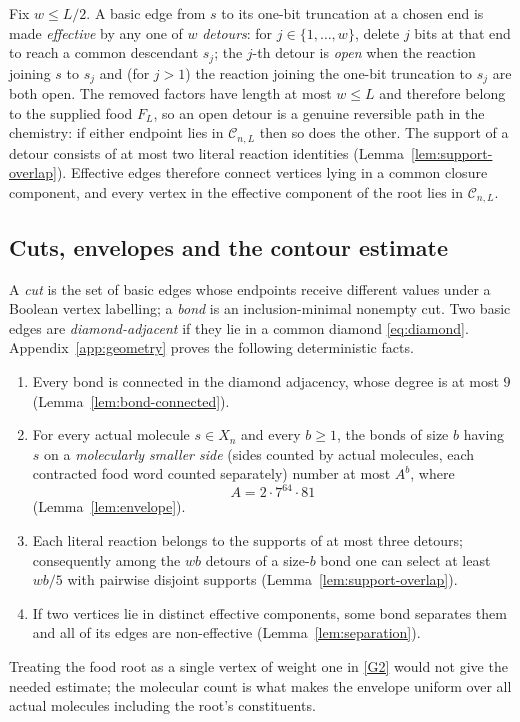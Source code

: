 \documentclass[11pt,reqno]{amsart}
\theoremstyle{plain}
\theoremstyle{definition}
\theoremstyle{remark}
\numberwithin{equation}{section}
\newcommand{\cC}{\mathcal{C}}
\begin{document}
Fix $w\le L/2$. A basic edge from $s$ to its one-bit truncation at a chosen end is made \emph{effective} by any one of $w$ \emph{detours}: for $j\in\{1,\dots,w\}$, delete $j$ bits at that end to reach a common descendant $s_j$; the $j$-th detour is \emph{open} when the reaction joining $s$ to $s_j$ and (for $j>1$) the reaction joining the one-bit truncation to $s_j$ are both open. The removed factors have length at most $w\le L$ and therefore belong to the supplied food $F_L$, so an open detour is a genuine reversible path in the chemistry: if either endpoint lies in $\cC_{n,L}$ then so does the other. The support of a detour consists of at most two literal reaction identities (Lemma~\ref{lem:support-overlap}). Effective edges therefore connect vertices lying in a common closure component, and every vertex in the effective component of the root lies in $\cC_{n,L}$.

\subsection{Cuts, envelopes and the contour estimate}
A \emph{cut} is the set of basic edges whose endpoints receive different values under a Boolean vertex labelling; a \emph{bond} is an inclusion-minimal nonempty cut. Two basic edges are \emph{diamond-adjacent} if they lie in a common diamond \eqref{eq:diamond}. Appendix~\ref{app:geometry} proves the following deterministic facts.
\begin{enumerate}[label=(G\arabic*)]
\item\label{G1} Every bond is connected in the diamond adjacency, whose degree is at most $9$ (Lemma~\ref{lem:bond-connected}).
\item\label{G2} For every actual molecule $s\in X_n$ and every $b\ge1$, the bonds of size $b$ having $s$ on a \emph{molecularly smaller side} (sides counted by actual molecules, each contracted food word counted separately) number at most $A^b$, where
\begin{equation}\label{eq:A}
A=2\cdot7^{64}\cdot81
\end{equation}
(Lemma~\ref{lem:envelope}).
\item\label{G3} Each literal reaction belongs to the supports of at most three detours; consequently among the $wb$ detours of a size-$b$ bond one can select at least $wb/5$ with pairwise disjoint supports (Lemma~\ref{lem:support-overlap}).
\item\label{G4} If two vertices lie in distinct effective components, some bond separates them and all of its edges are non-effective (Lemma~\ref{lem:separation}).
\end{enumerate}
Treating the food root as a single vertex of weight one in \ref{G2} would not give the needed estimate; the molecular count is what makes the envelope uniform over all actual molecules including the root's constituents.
\end{document}
